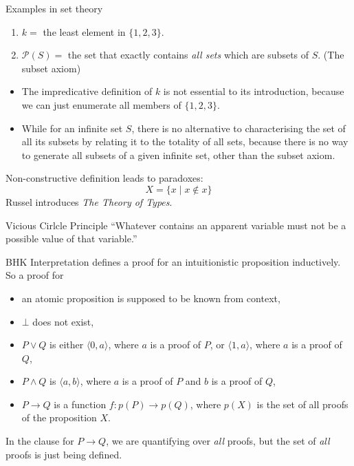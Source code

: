 \documentclass{beamer}
\begin{document}
\begin{frame}{\subImprDef}
	\begin{exampleblock}{Examples in set theory}
		\begin{enumerate}
			\item $k =$ the least element in $\{1, 2, 3\}$.
			\item $\mathcal{P}(S) =$ the set that exactly contains \emph{all sets} which are subsets of $S$. (The subset axiom)
		\end{enumerate}
	\end{exampleblock}
	\begin{itemize}
		\item The impredicative definition	of $k$ is not essential to its introduction, because we can just enumerate all members of $\{ 1, 2, 3\}$.
		\item While for an inﬁnite set $S$, there is no alternative to characterising the set of all its subsets by relating it to the totality of all sets, because there is no way to generate all subsets of a given inﬁnite set, other than the subset axiom.
	\end{itemize}
\end{frame}

\begin{frame}{\subImprDef}
	Non-constructive definition leads to paradoxes:
	\[X = \{ x \mid x \notin x \} \]
	Russel introduces \emph{The Theory of Types}.
	\begin{block}{Vicious Cirlcle Principle}
		``Whatever contains an apparent variable must not be a possible value of that variable.'' \cite{russell1908mathematical}
		\vspace{1ex}
	\end{block}
\end{frame}

\begin{frame}{\subBHK}
	BHK Interpretation defines a proof for an intuitionistic proposition inductively. So a proof for
	\begin{itemize}
		\small
		\item an atomic proposition is supposed to be known from context,
		\item $\bot$ does not exist,
		\item $P \vee Q$ is either $\langle 0, a \rangle$, where $a$ is a proof of $P$, or $\langle 1, a \rangle$, where $a$ is a proof of $Q$,
		\item $P \wedge Q$ is $\langle a, b \rangle$, where $a$ is a proof of $P$ and $b$ is a proof of $Q$,
		\large
		\item $P \rightarrow Q$ is a function $f : p(P) \rightarrow p(Q)$, where $p(X)$ is the set of all proofs of the proposition $X$.
	\end{itemize}
	In the clause for $P \rightarrow Q$, we are quantifying over \emph{all} proofs, but the set of \emph{all} proofs is just being defined.
\end{frame}
\end{document}
